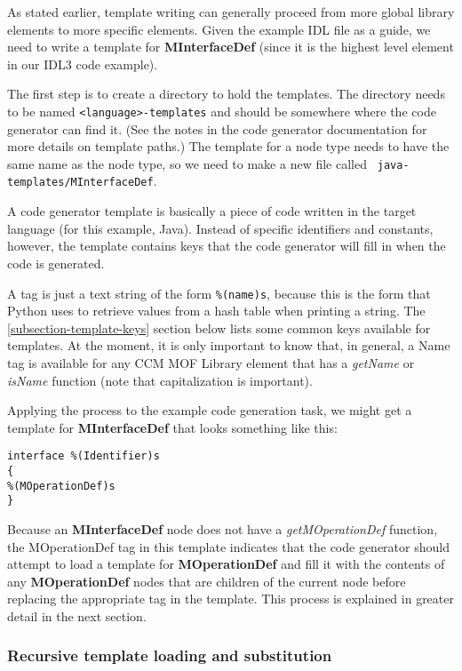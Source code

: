 As stated earlier, template writing can generally proceed from more global
library elements to more specific elements. Given the example IDL file as a
guide, we need to write a template for {\bf MInterfaceDef} (since it is the
highest level element in our IDL3 code example).

The first step is to create a directory to hold the templates. The directory
needs to be named {\tt <language>-templates} and should be somewhere where the
code generator can find it. (See the notes in the code generator documentation
for more details on template paths.) The template for a node type needs to have
the same name as the node type, so we need to make a new file called {\tt
java-templates/MInterfaceDef}.

A code generator template is basically a piece of code written in the target
language (for this example, Java). Instead of specific identifiers and
constants, however, the template contains keys that the code generator will fill
in when the code is generated.

A tag is just a text string of the form {\tt \%(name)s}, because this is the
form that Python uses to retrieve values from a hash table when printing a
string. The \ref{subsection-template-keys} section below lists some common keys
available for templates. At the moment, it is only important to know that, in
general, a {\sf Name} tag is available for any CCM MOF Library element that has
a {\it getName\/} or {\it isName\/} function (note that capitalization is
important).

Applying the process to the example code generation task, we might get a
template for {\bf MInterfaceDef} that looks something like this:

\begin{verbatim}
interface %(Identifier)s
{
%(MOperationDef)s
}
\end{verbatim}

Because an {\bf MInterfaceDef} node does not have a {\it getMOperationDef\/}
function, the {\sf MOperationDef} tag in this template indicates that the code
generator should attempt to load a template for {\bf MOperationDef} and fill it
with the contents of any {\bf MOperationDef} nodes that are children of the
current node before replacing the appropriate tag in the template. This process
is explained in greater detail in the next section.


\subsubsection{Recursive template loading and substitution}

